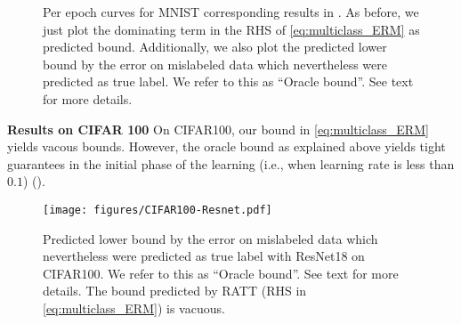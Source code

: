 \begin{figure}[h]
    \centering 
     \hfil
    \caption{ Per epoch curves for MNIST corresponding results in . As before, we just plot the dominating term in the RHS of \eqref{eq:multiclass_ERM} as predicted bound. Additionally, we also plot the predicted lower bound by the error on mislabeled data which nevertheless were predicted as true label. We refer to this as ``Oracle bound''. See text for more details. 
    }\label{fig:error_epoch_MNIST}
\end{figure}

\textbf{Results on CIFAR 100 {} {}} 
% 
On CIFAR100, our bound in \eqref{eq:multiclass_ERM} yields vacous bounds. However, the oracle bound as explained above yields tight guarantees in the initial phase of the learning (i.e., when learning rate is less than $0.1$) ().  

\begin{figure}[h]
    \centering 
    \texttt{[image: figures/CIFAR100-Resnet.pdf]}
    \caption{ Predicted lower bound by the error on mislabeled data which nevertheless were predicted as true label with ResNet18 on CIFAR100. We refer to this as ``Oracle bound''. See text for more details. 
    The bound predicted by RATT (RHS in \eqref{eq:multiclass_ERM}) is vacuous. 
    }\label{fig:error_CIFAR100}
\end{figure}




